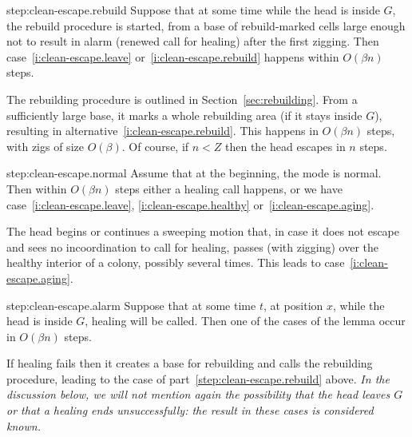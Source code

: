 \documentclass[12pt]{memoir}
\def\G{G}
\begin{document}
\begin{Proof}
\begin{step+}{step:clean-escape.rebuild}
Suppose that at some time while the head is inside \( \G \), the rebuild procedure is started,
from a base of rebuild-marked cells large enough not to result in alarm (renewed call for healing)
after the first zigging.
Then case~\eqref{i:clean-escape.leave} or~\eqref{i:clean-escape.rebuild} 
happens within \( O(\beta n) \) steps.
\end{step+}
\begin{pproof}
The rebuilding procedure is outlined in Section~\ref{sec:rebuilding}.
From a sufficiently large base, it 
marks a whole rebuilding area (if it stays inside \( G \)), resulting
in alternative~\eqref{i:clean-escape.rebuild}.
This happens in \( O(\beta n) \) steps, with zigs of size \( O(\beta) \).
Of course, if \( n<Z \) then the head escapes in \( n \) steps.
\end{pproof} %

\begin{step+}{step:clean-escape.normal}
Assume that at the beginning, the mode is normal.
Then within \( O(\beta n) \) steps either a healing call happens, or we have 
case~\eqref{i:clean-escape.leave}, \eqref{i:clean-escape.healthy} or~\eqref{i:clean-escape.aging}.
\end{step+}
\begin{pproof}
The head begins or continues a sweeping motion that, in case it does not escape
and sees no incoordination to call for healing,
passes (with zigging) over the healthy interior of a colony, possibly several times.
This leads to case~\eqref{i:clean-escape.aging}.
\end{pproof} %

\begin{step+}{step:clean-escape.alarm}
Suppose that at some time \( t \), at position \( x \),
while the head is inside \( \G \), healing will be called.
Then one of the cases of the lemma occur in \( O(\beta n) \) steps.
\end{step+}
\begin{pproof}
If healing fails then it creates a base for rebuilding and calls the rebuilding
procedure, leading to the case of part~\ref{step:clean-escape.rebuild} above.
\emph{In the discussion below, we will not mention again the possibility that the head
leaves \( G \) or that a healing ends unsuccessfully: the result in these cases is considered
known.}


\end{pproof}
\end{Proof}
\end{document}
